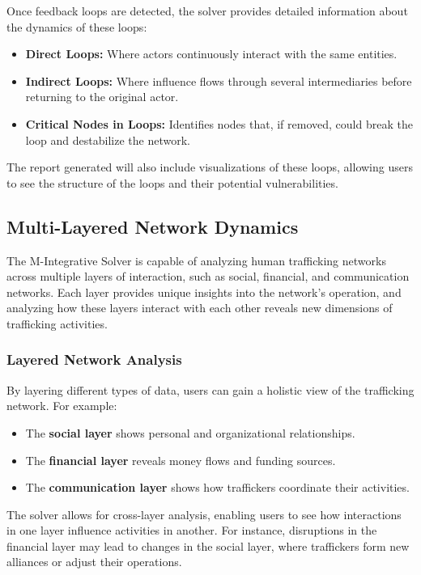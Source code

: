\documentclass[%
 preprint, linenumbers,
 amsmath,amssymb,
 aps, physrev,
]{revtex4-2}
\begin{document}
Once feedback loops are detected, the solver provides detailed information about the dynamics of these loops:
\begin{itemize}
    \item \textbf{Direct Loops:} Where actors continuously interact with the same entities.
    \item \textbf{Indirect Loops:} Where influence flows through several intermediaries before returning to the original actor.
    \item \textbf{Critical Nodes in Loops:} Identifies nodes that, if removed, could break the loop and destabilize the network.
\end{itemize}

The report generated will also include visualizations of these loops, allowing users to see the structure of the loops and their potential vulnerabilities.

\subsection{Multi-Layered Network Dynamics}

The M-Integrative Solver is capable of analyzing human trafficking networks across multiple layers of interaction, such as social, financial, and communication networks. Each layer provides unique insights into the network’s operation, and analyzing how these layers interact with each other reveals new dimensions of trafficking activities.

\subsubsection{Layered Network Analysis}

By layering different types of data, users can gain a holistic view of the trafficking network. For example:
\begin{itemize}
    \item The \textbf{social layer} shows personal and organizational relationships.
    \item The \textbf{financial layer} reveals money flows and funding sources.
    \item The \textbf{communication layer} shows how traffickers coordinate their activities.
\end{itemize}

The solver allows for cross-layer analysis, enabling users to see how interactions in one layer influence activities in another. For instance, disruptions in the financial layer may lead to changes in the social layer, where traffickers form new alliances or adjust their operations.
\end{document}
